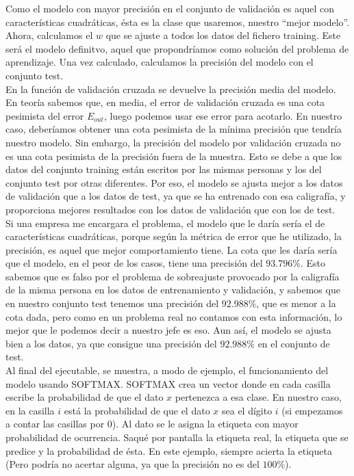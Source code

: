 \documentclass{article}
\begin{document}
Como el modelo con mayor precisión en el conjunto de validación es aquel con características cuadráticas, ésta es la clase que usaremos, nuestro ``mejor modelo''. Ahora, calculamos el $w$ que se ajuste a todos los datos del fichero training. Este será el modelo definitvo, aquel que propondríamos como solución del problema de aprendizaje. Una vez calculado, calculamos la precisión del modelo con el conjunto test.\\

En la función de validación cruzada se devuelve la precisión media del modelo. En teoría sabemos que, en media, el error de validación cruzada es una cota pesimista del error $E_{out}$, luego podemos usar ese error para acotarlo. En nuestro caso, deberíamos obtener una cota pesimista de la mínima precisión que tendría nuestro modelo. Sin embargo, la precisión del modelo por validación cruzada no es una cota pesimista de la precisión fuera de la muestra. Esto se debe a que los datos del conjunto training están escritos por las mismas personas y los del conjunto test por otras diferentes. Por eso, el modelo se ajusta mejor a los datos de validación que a los datos de test, ya que se ha entrenado con esa caligrafía, y proporciona mejores resultados con los datos de validación que con los de test.\\

Si una empresa me encargara el problema, el modelo que le daría sería el de características cuadráticas, porque según la métrica de error que he utilizado, la precisión, es aquel que mejor comportamiento tiene. La cota que les daría sería que el modelo, en el peor de los casos, tiene una precisión del $93.796\%$. Esto sabemos que es falso por el problema de sobreajuste provocado por la caligrafía de la misma persona en los datos de entrenamiento y validación, y sabemos que en nuestro conjunto test tenemos una precisión del $92.988\%$, que es menor a la cota dada, pero como en un problema real no contamos con esta información, lo mejor que le podemos decir a nuestro jefe es eso. Aun así, el modelo se ajusta bien a los datos, ya que consigue una precisión del $92.988\%$ en el conjunto de test.\\

Al final del ejecutable, se muestra, a modo de ejemplo, el funcionamiento del modelo usando SOFTMAX. SOFTMAX crea un vector donde en cada casilla escribe la probabilidad de que el dato $x$ pertenezca a esa clase. En nuestro caso, en la casilla $i$ está la probabilidad de que el dato $x$ sea el dígito $i$ (si empezamos a contar las casillas por $0$). Al dato se le asigna la etiqueta con mayor probabilidad de ocurrencia. Saqué por pantalla la etiqueta real, la etiqueta que se predice y la probabilidad de ésta. En este ejemplo, siempre acierta la etiqueta (Pero podría no acertar alguna, ya que la precisión no es del $100\%$).
\end{document}
